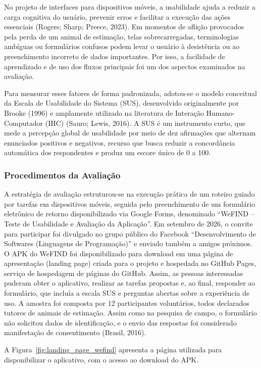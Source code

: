 No projeto de interfaces para dispositivos móveis, a usabilidade ajuda a reduzir a carga cognitiva do usuário, prevenir erros e facilitar a execução das ações essenciais (Rogers; Sharp; Preece, 2023). Em momentos de aflição provocados pela perda de um animal de estimação, telas sobrecarregadas, terminologias ambíguas ou formulários confusos podem levar o usuário à desistência ou ao preenchimento incorreto de dados importantes. Por isso, a facilidade de aprendizado e de uso dos fluxos principais foi um dos aspectos examinados na avaliação.

Para mensurar esses fatores de forma padronizada, adotou-se o modelo conceitual da Escala de Usabilidade do Sistema (SUS), desenvolvido originalmente por Brooke (1996) e amplamente utilizado na literatura de Interação Humano-Computador (IHC) (Sauro; Lewis, 2016). A SUS é um instrumento curto, que mede a percepção global de usabilidade por meio de dez afirmações que alternam enunciados positivos e negativos, recurso que busca reduzir a concordância automática dos respondentes e produz um escore único de 0 a 100.

\subsubsection{Procedimentos da Avaliação}

A estratégia de avaliação estruturou-se na execução prática de um roteiro guiado por tarefas em dispositivos móveis, seguida pelo preenchimento de um formulário eletrônico de retorno disponibilizado via Google Forms, denominado ``WeFIND -- Teste de Usabilidade e Avaliação da Aplicação''. Em setembro de 2026, o convite para participar foi divulgado no grupo público do Facebook ``Desenvolvimento de Softwares (Linguagens de Programação)'' e enviado também a amigos próximos. O APK do WeFIND foi disponibilizado para download em uma página de apresentação (landing page) criada para o projeto e hospedada no GitHub Pages, serviço de hospedagem de páginas do GitHub. Assim, as pessoas interessadas puderam obter o aplicativo, realizar as tarefas propostas e, ao final, responder ao formulário, que incluía a escala SUS e perguntas abertas sobre a experiência de uso. A amostra foi composta por 12 participantes voluntários, todos declarados tutores de animais de estimação. Assim como na pesquisa de campo, o formulário não solicitou dados de identificação, e o envio das respostas foi considerado manifestação de consentimento (Brasil, 2016).

A Figura~\ref{fig:landing_page_wefind} apresenta a página utilizada para disponibilizar o aplicativo, com o acesso ao download do APK.


